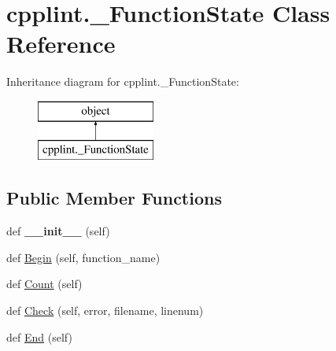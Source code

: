 \hypertarget{classcpplint_1_1__FunctionState}{}\section{cpplint.\+\_\+\+Function\+State Class Reference}
\label{classcpplint_1_1__FunctionState}
Inheritance diagram for cpplint.\+\_\+\+Function\+State\+:\begin{figure}[H]
\begin{center}
\leavevmode
\includegraphics[height=2.000000cm]{classcpplint_1_1__FunctionState}
\end{center}
\end{figure}
\subsection*{Public Member Functions}
\begin{DoxyCompactItemize}
\item 
def {\bfseries \+\_\+\+\_\+init\+\_\+\+\_\+} (self)\hypertarget{classcpplint_1_1__FunctionState_a3f6a865710852cc74c6a7085180458ae}{}\label{classcpplint_1_1__FunctionState_a3f6a865710852cc74c6a7085180458ae}

\item 
def \hyperlink{classcpplint_1_1__FunctionState_a41215c4d73baccbb340f6d0df1c1f4b3}{Begin} (self, function\+\_\+name)
\item 
def \hyperlink{classcpplint_1_1__FunctionState_ac25c9711911ae181b091b52619cf2701}{Count} (self)
\item 
def \hyperlink{classcpplint_1_1__FunctionState_a5e4ad7d7b104038b45204ab4abf527b2}{Check} (self, error, filename, linenum)
\item 
def \hyperlink{classcpplint_1_1__FunctionState_a1ab6b0a575c25c135f9004b7fb12dc4a}{End} (self)
\end{DoxyCompactItemize}
